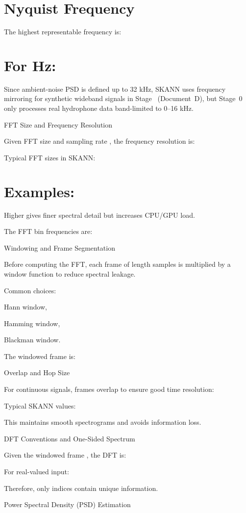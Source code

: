 \documentclass[12pt]{article}
\begin{document}
\section*{Nyquist Frequency}
The highest representable frequency is:


\section*{For  Hz:}

Since ambient-noise PSD is defined up to 32 kHz, SKANN uses frequency mirroring for synthetic wideband signals in Stage  (Document D), but Stage 0 only processes real hydrophone data band-limited to 0–16 kHz.

FFT Size and Frequency Resolution

Given FFT size  and sampling rate , the frequency resolution is:


Typical FFT sizes in SKANN:


\section*{Examples:}


Higher  gives finer spectral detail but increases CPU/GPU load.

The FFT bin frequencies are:


Windowing and Frame Segmentation

Before computing the FFT, each frame of length  samples is multiplied by a window function  to reduce spectral leakage.

Common choices:

Hann window,

Hamming window,

Blackman window.

The windowed frame is:


Overlap and Hop Size

For continuous signals, frames overlap to ensure good time resolution:


Typical SKANN values:


This maintains smooth spectrograms and avoids information loss.

DFT Conventions and One-Sided Spectrum

Given the windowed frame , the DFT is:


For real-valued input:


Therefore, only indices  contain unique information.

Power Spectral Density (PSD) Estimation
\end{document}
